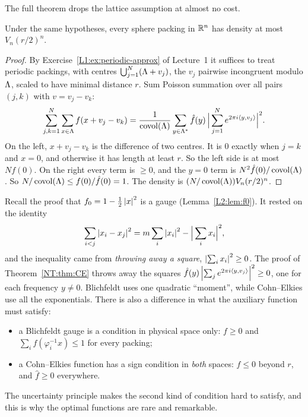 The full theorem drops the lattice assumption at almost no cost.

\begin{theorem}\label{NT:thm:CE}
Under the same hypotheses, every sphere packing in $\mathbb{R}^n$ has density at most $V_n(r/2)^n$.
\end{theorem}

\begin{proof}
By Exercise~\ref{L1:ex:periodic-approx} of Lecture~1 it suffices to treat periodic packings, with
centres $\bigcup_{j=1}^N(\Lambda+v_j)$, the $v_j$ pairwise incongruent modulo $\Lambda$, scaled to have
minimal distance $r$. Sum Poisson summation over all pairs
$(j,k)$ with $v=v_j-v_k$:
\[
  \sum_{j,k=1}^N\sum_{x\in\Lambda}f(x+v_j-v_k)
  =\frac{1}{\operatorname{covol}(\Lambda)}\sum_{y\in\Lambda^*}\hat f(y)\,\Big|\sum_{j=1}^Ne^{2\pi i\langle y, v_j\rangle}\Big|^2 .
\]
On the left, $x+v_j-v_k$ is the difference of two centres. It is $0$ exactly when $j=k$ and $x=0$, and
otherwise it has length at least $r$. So the left side is at most $Nf(0)$. On the right every term is
$\ge0$, and the $y=0$ term is $N^2\hat f(0)/\operatorname{covol}(\Lambda)$. So $N/\operatorname{covol}(\Lambda)\le f(0)/\hat f(0)=1$. The
density is $(N/\operatorname{covol}(\Lambda))V_n(r/2)^n$.
\end{proof}

\begin{remark}\label{NT:rem:blichfeldt-vs-CE}
Recall the proof that $f_0=1-\frac12\left\lvert x \right\rvert^2$ is a gauge (Lemma~\ref{L2:lem:f0}). It rested on the identity
\[
  \sum_{i<j}\left\lvert x_i-x_j \right\rvert^2=m\sum_i\left\lvert x_i \right\rvert^2-\Big|\sum_ix_i\Big|^2,
\]
and the inequality came from \emph{throwing away a square}, $\left\lvert \sum_ix_i \right\rvert^2\ge0$. The proof of
Theorem~\ref{NT:thm:CE} throws away the squares $\hat f(y)\left\lvert \sum_je^{2\pi i\langle y, v_j\rangle} \right\rvert^2\ge0$, one for
each frequency $y\ne0$. Blichfeldt uses one quadratic ``moment'', while Cohn--Elkies use all the
exponentials. There is also a difference in what the auxiliary function must satisfy:
\begin{itemize}[nosep]
\item a Blichfeldt gauge is a condition in physical space only: $f\ge0$ and
  $\sum_if(\varphi_i^{-1}x)\le1$ for every packing;
\item a Cohn--Elkies function has a sign condition in \emph{both} spaces: $f\le0$ beyond $r$, and
  $\hat f\ge0$ everywhere.
\end{itemize}
The uncertainty principle makes the second kind of condition hard to satisfy, and this is why the
optimal functions are rare and remarkable.
\end{remark}

